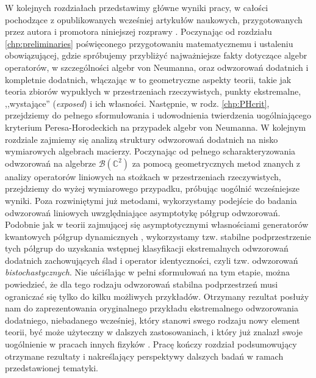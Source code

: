 W kolejnych rozdziałach przedstawimy główne wyniki pracy,
w całości pochodzące z opublikowanych wcześniej artykułów naukowych,
przygotowanych przez autora i promotora niniejszej rozprawy
\cite{miller2014horodeckis,miller2015stable,miller2015topology}.
Poczynając od rozdziału \ref{chp:preliminaries} poświęconego przygotowaniu
matematycznemu i ustaleniu obowiązującej,
gdzie spróbujemy przybliżyć najważniejsze fakty dotyczące algebr operatorów,
w szczególności algebr von Neumanna,
oraz odwzorowań dodatnich i kompletnie dodatnich,
włączając w to geometryczne aspekty teorii,
takie jak teoria zbiorów wypukłych w przestrzeniach rzeczywistych,
punkty ekstremalne, ,,wystające'' (\emph{exposed}) i ich własności.
Następnie,
w rodz. \ref{chp:PHcrit},
przejdziemy do pełnego sformułowania i udowodnienia twierdzenia
uogólniającego kryterium Peresa-Horodeckich na przypadek algebr von Neumanna.
W kolejnym rozdziale zajmiemy się analizą struktury odwzorowań dodatnich na
nisko wymiarowych algebrach macierzy.
Poczynając od pełnego scharakteryzowania odwzorowań na algebrze
$\mathcal{B}(\mathbb{C}^{2})$ za pomocą geometrycznych metod znanych z analizy
operatorów liniowych na stożkach w przestrzeniach rzeczywistych,
przejdziemy do wyżej wymiarowego przypadku,
próbując uogólnić wcześniejsze wyniki.
Poza rozwiniętymi już metodami,
wykorzystamy podejście do badania odwzorowań
liniowych uwzględniające asymptotykę półgrup odwzorowań.
Podobnie jak w teorii
zajmującej się asymptotycznymi własnościami generatorów kwantowych półgrup
dynamicznych \cite{olkiewicz1999environment},
wykorzystamy tzw. stabilne podprzestrzenie tych półgrup do uzyskania
wstępnej klasyfikacji ekstremalnych odwzorowań dodatnich
zachowujących ślad i operator identyczności,
czyli tzw. odwzorowań \emph{bistochastycznych}.
Nie uściślając w pełni sformułowań na tym etapie,
można powiedzieć,
że dla tego rodzaju odwzorowań stabilna podprzestrzeń musi ograniczać się
tylko do kilku możliwych przykładów.
Otrzymany rezultat posłuży nam do zaprezentowania oryginalnego przykładu
ekstremalnego odwzorowania dodatniego, niebadanego wcześniej,
który stanowi swego rodzaju nowy element teorii,
być może użyteczny w dalszych zastosowaniach,
i który już znalazł swoje uogólnienie w pracach innych fizyków
\cite{rutkowski2015class}.
Pracę kończy rozdział podsumowujący otrzymane rezultaty i nakreślający
perspektywy dalszych badań w ramach przedstawionej tematyki.

